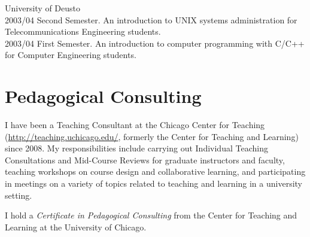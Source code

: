 \documentclass{resume}
\begin{document}
\begin{category}{University of Deusto} 
\\
2003/04 Second Semester. An introduction to UNIX systems administration for Telecommunications Engineering students.
\\
2003/04 First Semester. An introduction to computer programming with C/C++ for Computer Engineering students.
\end{category}

\section*{\hspace{-1cm}Pedagogical Consulting}

I have been a Teaching Consultant at the Chicago Center for Teaching (\url{http://teaching.uchicago.edu/}, formerly the Center for Teaching and Learning) since 2008. My responsibilities include carrying out Individual Teaching Consultations and Mid-Course Reviews for graduate instructors and faculty, teaching workshops on course design and collaborative learning, and participating in meetings on a variety of topics related to teaching and learning in a university setting.

I hold a \emph{Certificate in Pedagogical Consulting} from the Center for Teaching and Learning at the University of Chicago.
\end{document}

